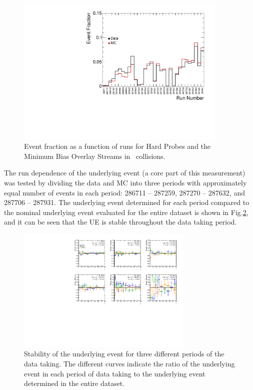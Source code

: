  \begin{figure}[h]
    \centerline{
       \includegraphics[width=0.9\textwidth]{figures/main/general/EventPercentages_c0.pdf}
    }
    \caption{Event fraction as a function of runs for Hard Probes and the Minimum Bias Overlay Streams in \pbpb\ collisions.}
    \label{fig:evnt_fraction}
 \end{figure}

The run dependence of the underlying event (a core part of this measurement) was tested by dividing the data and MC into three periods with approximately equal number of events in each period: 286711 -- 287259, 287270 -- 287632, and 287706 -- 287931.
The underlying event determined for each period compared to the nominal underlying event evaluated for the entire dataset is shown in Fig.\ref{fig:weighted_runs}, and it can be seen that the UE is stable throughout the data taking period.

 \begin{figure}[h]
    \centerline{
       \includegraphics[width=0.75\textwidth]{figures/main/general/weightedRuns.pdf}
    }
    \caption{Stability of the underlying event for three different periods of the data taking.
The different curves indicate the ratio of the underlying event in each period of data taking to the underlying event determined in the entire dataset.}
    \label{fig:weighted_runs}
 \end{figure}


